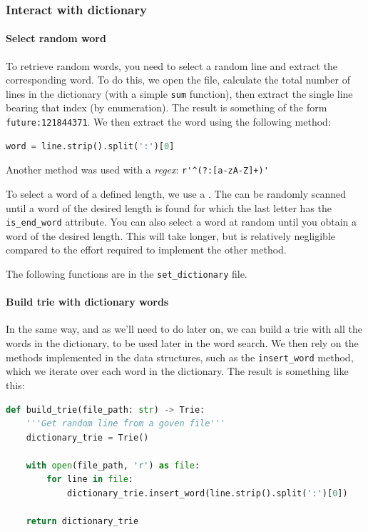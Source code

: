 \documentclass[10pt,a4paper,hidelinks]{article}
\begin{document}
\subsubsection{Interact with dictionary}
\paragraph{Select random word}
To retrieve random words, you need to select a random line and extract the corresponding word. To do this, we open the file, calculate the total number of lines in the dictionary (with a simple \verb|sum| function), then extract the single line bearing that index (by enumeration). The result is something of the form \verb|future:121844371|. We then extract the word using the following method:
\begin{lstlisting}[language=Python]
word = line.strip().split(':')[0]
\end{lstlisting}
Another method was used with a \textit{regex}: \verb|r'^(?:[a-zA-Z]+)'|

To select a word of a defined length, we use a . The  can be randomly scanned until a word of the desired length is found for which the last letter has the \verb|is_end_word| attribute. You can also select a word at random until you obtain a word of the desired length. This will take longer, but is relatively negligible compared to the effort required to implement the other method.

The following functions are in the \verb|set_dictionary| file.
\paragraph{Build trie with dictionary words}
In the same way, and as we'll need to do later on, we can build a trie with all the words in the dictionary, to be used later in the word search. We then rely on the methods implemented in the  data structures, such as the \verb|insert_word| method, which we iterate over each word in the dictionary. The result is something like this:
\begin{lstlisting}[language=Python]
def build_trie(file_path: str) -> Trie:
    '''Get random line from a goven file'''
    dictionary_trie = Trie()

    with open(file_path, 'r') as file:
        for line in file:
            dictionary_trie.insert_word(line.strip().split(':')[0])

    return dictionary_trie
\end{lstlisting}
\end{document}
